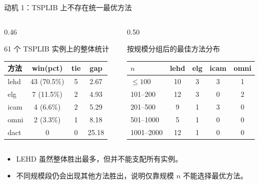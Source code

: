 \documentclass{ctexbeamer}
\begin{document}
\begin{frame}{动机 1：TSPLIB 上不存在统一最优方法}
  \scriptsize
  \begin{columns}[T]
    \begin{column}{0.46\textwidth}
      \begin{block}{61 个 TSPLIB 实例上的整体统计}
        \begin{tabular}{lccc}
          \hline
          方法 & win(pct) & tie & gap \\
          \hline
          lehd & 43 (70.5\%) & 5 & 2.67 \\
          elg  & 7 (11.5\%)  & 2 & 4.93 \\
          icam & 4 (6.6\%)   & 2 & 5.29 \\
          omni & 2 (3.3\%)   & 1 & 8.18 \\
          dact & 0           & 0 & 25.18 \\
          \hline
        \end{tabular}
      \end{block}
    \end{column}
    \begin{column}{0.50\textwidth}
      \begin{block}{按规模分组后的最佳方法分布}
        \begin{tabular}{lcccc}
          \hline
          $n$ & lehd & elg & icam & omni \\
          \hline
          $\leq 100$ & 10 & 3 & 3 & 1 \\
          101--200 & 12 & 3 & 0 & 2 \\
          201--500 & 9 & 1 & 3 & 0 \\
          501--1000 & 5 & 1 & 0 & 0 \\
          1001--2000 & 12 & 1 & 0 & 0 \\
          \hline
        \end{tabular}
      \end{block}
    \end{column}
  \end{columns}

  \vspace{0.4em}
  \begin{itemize}
    \item LEHD 虽然整体胜出最多，但并不能支配所有实例。
    \item 不同规模段仍会出现其他方法胜出，说明仅靠规模 $n$ 不能选择最优方法。
  \end{itemize}
\end{frame}
\end{document}
